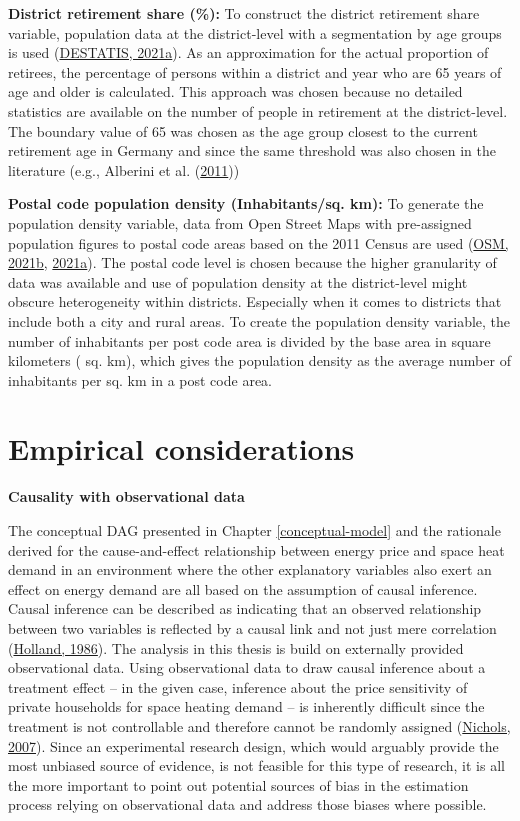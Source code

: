 \documentclass[12pt,twoside]{reedthesis}
\begin{document}
\textbf{District retirement share (\%):} To construct the district retirement share variable, population data at the district-level with a segmentation by age groups is used (\protect\hyperlink{ref-destatis21c}{DESTATIS, 2021a}). As an approximation for the actual proportion of retirees, the percentage of persons within a district and year who are 65 years of age and older is calculated. This approach was chosen because no detailed statistics are available on the number of people in retirement at the district-level. The boundary value of 65 was chosen as the age group closest to the current retirement age in Germany and since the same threshold was also chosen in the literature (e.g., Alberini et al. (\protect\hyperlink{ref-alberini_etal11}{2011}))

\textbf{Postal code population density (Inhabitants/sq. km):} To generate the population density variable, data from Open Street Maps with pre-assigned population figures to postal code areas based on the 2011 Census are used (\protect\hyperlink{ref-osm21}{OSM, 2021b}, \protect\hyperlink{ref-osm21a}{2021a}). The postal code level is chosen because the higher granularity of data was available and use of population density at the district-level might obscure heterogeneity within districts. Especially when it comes to districts that include both a city and rural areas. To create the population density variable, the number of inhabitants per post code area is divided by the base area in square kilometers ( sq. km), which gives the population density as the average number of inhabitants per sq. km in a post code area.

\hypertarget{empirical-considerations}{%
\section{Empirical considerations}\label{empirical-considerations}}

\textbf{Causality with observational data}

The conceptual DAG presented in Chapter \ref{conceptual-model} and the rationale derived for the cause-and-effect relationship between energy price and space heat demand in an environment where the other explanatory variables also exert an effect on energy demand are all based on the assumption of causal inference. Causal inference can be described as indicating that an observed relationship between two variables is reflected by a causal link and not just mere correlation (\protect\hyperlink{ref-holland86}{Holland, 1986}). The analysis in this thesis is build on externally provided observational data. Using observational data to draw causal inference about a treatment effect -- in the given case, inference about the price sensitivity of private households for space heating demand -- is inherently difficult since the treatment is not controllable and therefore cannot be randomly assigned (\protect\hyperlink{ref-nichols07}{Nichols, 2007}). Since an experimental research design, which would arguably provide the most unbiased source of evidence, is not feasible for this type of research, it is all the more important to point out potential sources of bias in the estimation process relying on observational data and address those biases where possible.
\end{document}
